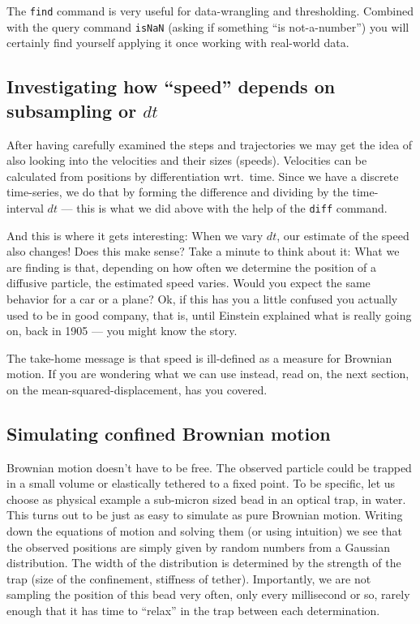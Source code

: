 The \lstinline{find} command is very useful for data-wrangling and thresholding. 
Combined with the query command \lstinline{isNaN} (asking if something ``is not-a-number'') you will  certainly find yourself applying it once working with real-world data.

\subsection{Investigating how ``speed'' depends on subsampling or $dt$}
After having carefully examined the steps and trajectories we may get the  idea of also looking into the velocities and their sizes (speeds).
Velocities can be calculated from positions by differentiation wrt.\ time.
Since we have a discrete time-series, we do that by forming the difference and dividing by the time-interval $dt$ --- this is what we did above with the help of the \lstinline{diff} command.

And this is where it gets interesting: When we vary $dt$, our estimate of the speed also changes!
Does this make sense?
Take a minute to think about it: What we are finding is that, depending on how often we determine the position of a diffusive particle, the estimated speed varies. 
Would you expect the same behavior for a car or a plane?
Ok, if this has you a little confused you actually used to be in good company, that is, until Einstein explained what is really going on, back in 1905 --- you might know the story.

The take-home message is that speed is ill-defined as a measure for Brownian motion.
If you are wondering what we can use instead, read on, the next section, on the mean-squared-displacement, has you covered.

\subsection{Simulating confined Brownian motion}
Brownian motion doesn't have to be free. The observed particle could be trapped in a small volume or elastically tethered to a fixed point. 
To be specific, let us choose as physical example a sub-micron sized bead in an optical trap, in water.
This turns out to be just as easy to simulate as pure Brownian motion.
Writing down the equations of motion and solving them (or using intuition) we see that the observed positions are simply given by random numbers from a Gaussian distribution.  The width of the distribution is determined by the strength of the trap (size of the confinement, stiffness of tether).  Importantly, we are not sampling the position of this bead very often, only every millisecond or so, rarely enough that it has time to ``relax'' in the trap between each determination.